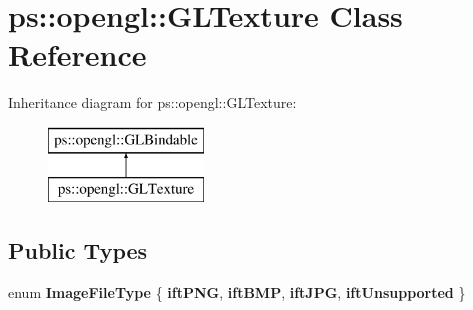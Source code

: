 \hypertarget{classps_1_1opengl_1_1GLTexture}{}\section{ps\+:\+:opengl\+:\+:G\+L\+Texture Class Reference}
\label{classps_1_1opengl_1_1GLTexture}
Inheritance diagram for ps\+:\+:opengl\+:\+:G\+L\+Texture\+:\begin{figure}[H]
\begin{center}
\leavevmode
\includegraphics[height=2.000000cm]{classps_1_1opengl_1_1GLTexture}
\end{center}
\end{figure}
\subsection*{Public Types}
\begin{DoxyCompactItemize}
\item 
\hypertarget{classps_1_1opengl_1_1GLTexture_ac711ed7b8ea94b66349dd3f18af2abc0}{}enum {\bfseries Image\+File\+Type} \{ {\bfseries ift\+P\+N\+G}, 
{\bfseries ift\+B\+M\+P}, 
{\bfseries ift\+J\+P\+G}, 
{\bfseries ift\+Unsupported}
 \}\label{classps_1_1opengl_1_1GLTexture_ac711ed7b8ea94b66349dd3f18af2abc0}

\end{DoxyCompactItemize}
